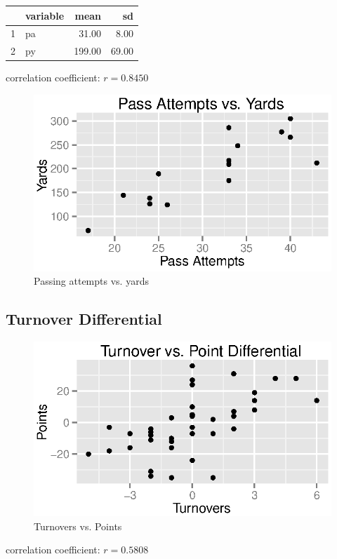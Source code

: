 \documentclass{exam}
\begin{document}
  \begin{table}[ht]
    \centering
    \begin{tabular}{rlrr}
      \toprule
        & variable & mean   & sd \\
      \midrule
      1 & pa       & 31.00  & 8.00 \\
      2 & py       & 199.00 & 69.00 \\
      \bottomrule
    \end{tabular}
  \end{table}

  correlation coefficient: $r = 0.8450$

  \begin{figure}[H]
    \centering
    \includegraphics{figures/nfl/passing_attempts_vs_yds.eps}
    \caption{Passing attempts vs. yards}
  \end{figure}

  \subsection{Turnover Differential}

  \begin{figure}[H]
    \centering
    \includegraphics{figures/nfl/to_vs_pts.eps}
    \caption{Turnovers vs. Points}
  \end{figure}

  correlation coefficient: $r = 0.5808$
\end{document}

